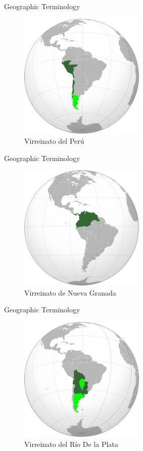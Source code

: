 \documentclass{beamer}
\begin{document}
\begin{frame}{Geographic Terminology}
\begin{figure}
\includegraphics[width=6cm]{figures/vice_peru.png}
\caption{Virreinato del Per\'{u}}
\end{figure}
\end{frame}

\begin{frame}{Geographic Terminology}
\begin{figure}
\includegraphics[width=6cm]{figures/vice_nuevagranada.png}
\caption{Virreinato de Nueva Granada}
\end{figure}
\end{frame}

\begin{frame}{Geographic Terminology}
\begin{figure}
\includegraphics[width=6cm]{figures/vice_riodelaplata.png}
\caption{Virreinato del R\'{i}o De la Plata}
\end{figure}
\end{frame}
\end{document}
